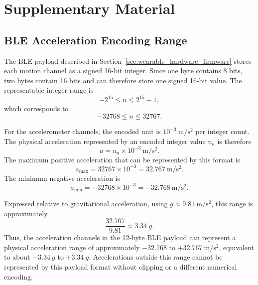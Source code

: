 \chapter{Supplementary Material}\label{app:supplementary}

\section{BLE Acceleration Encoding Range}\label{app:ble_acceleration_range}

The BLE payload described in Section~\ref{sec:wearable_hardware_firmware} stores each motion channel as a
signed 16-bit integer. Since one byte contains 8 bits, two bytes contain
16 bits and can therefore store one signed 16-bit value. The representable
integer range is
\begin{equation}
    -2^{15} \leq n \leq 2^{15}-1,
\end{equation}
which corresponds to
\begin{equation}
    -32768 \leq n \leq 32767.
\end{equation}

For the accelerometer channels, the encoded unit is
\(10^{-3}~\si{\meter\per\second\squared}\) per integer count. The physical
acceleration represented by an encoded integer value \(n_a\) is therefore
\begin{equation}
    a = n_a \times 10^{-3}~\si{\meter\per\second\squared}.
\end{equation}
The maximum positive acceleration that can be represented by this format is
\begin{equation}
    a_{\max} = 32767 \times 10^{-3}
    = 32.767~\si{\meter\per\second\squared}.
\end{equation}
The minimum negative acceleration is
\begin{equation}
    a_{\min} = -32768 \times 10^{-3}
    = -32.768~\si{\meter\per\second\squared}.
\end{equation}

Expressed relative to gravitational acceleration, using
\(g \approx 9.81~\si{\meter\per\second\squared}\), this range is approximately
\begin{equation}
    \frac{32.767}{9.81} \approx 3.34~g.
\end{equation}
Thus, the acceleration channels in the 12-byte BLE payload can represent a
physical acceleration range of approximately
\(-32.768\) to \(+32.767~\si{\meter\per\second\squared}\), equivalent to about
\(-3.34~g\) to \(+3.34~g\). Accelerations outside this range cannot be
represented by this payload format without clipping or a different numerical
encoding.


